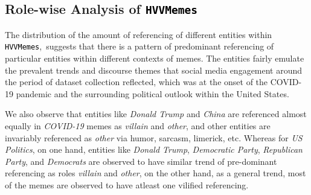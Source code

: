 \documentclass[11pt]{article}
\newcommand{\dataset}{\textcolor{black}{\texttt{HVVMemes}}}
\begin{document}
\subsection{Role-wise Analysis of \dataset}



The distribution of the amount of referencing of different entities within \dataset,\ suggests that there is a pattern of predominant referencing of particular entities within different contexts of memes. The entities fairly emulate the prevalent trends and discourse themes that social media engagement around the period of dataset collection reflected, which was at the onset of the COVID-19 pandemic and the surrounding political outlook within the United States.  



We also observe that entities like \textit{Donald Trump} and \textit{China} are referenced almost equally in \textit{COVID-19} memes as \textit{villain} and \textit{other}, and other entities are invariably referenced as \textit{other} via humor, sarcasm, limerick, etc. Whereas for \textit{US Politics}, on one hand, entities like \textit{Donald Trump}, \textit{Democratic Party}, \textit{Republican Party}, and \textit{Democrats} are observed to have similar trend of pre-dominant referencing as roles \textit{villain} and \textit{other}, on the other hand, as a general trend, most of the memes are observed to have atleast one vilified referencing. 
\end{document}
